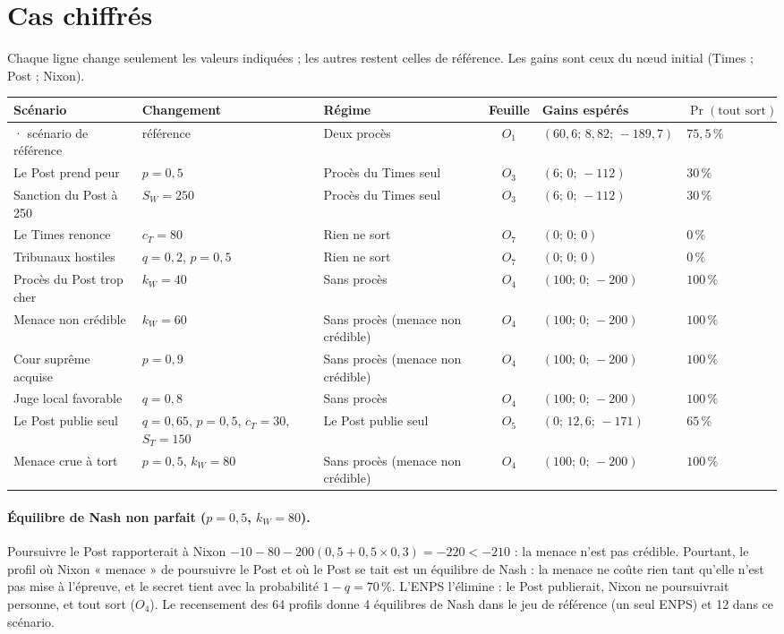 \documentclass[11pt,a4paper]{article}
\theoremstyle{definition}
\begin{document}
\section{Cas chiffrés}
Chaque ligne change seulement les valeurs indiquées ; les autres restent celles de référence. Les gains sont ceux du nœud initial (Times ; Post ; Nixon).
\begin{center}
\scriptsize
\begin{tabularx}{\textwidth}{@{}>{\raggedright\arraybackslash}p{3.1cm}>{\raggedright\arraybackslash}X>{\raggedright\arraybackslash}p{2.6cm}cll@{}}
\toprule
Scénario & Changement & Régime & Feuille & Gains espérés & $\Pr(\text{tout sort})$ \\
\midrule
1971 · scénario de référence & référence & Deux procès & $O_{1}$ & $(60,6;\,8,82;\,-189,7)$ & $75,5\,\%$ \\
Le Post prend peur & $p=0,5$ & Procès du Times seul & $O_{3}$ & $(6;\,0;\,-112)$ & $30\,\%$ \\
Sanction du Post à 250 & $S_W=250$ & Procès du Times seul & $O_{3}$ & $(6;\,0;\,-112)$ & $30\,\%$ \\
Le Times renonce & $c_T=80$ & Rien ne sort & $O_{7}$ & $(0;\,0;\,0)$ & $0\,\%$ \\
Tribunaux hostiles & $q=0,2$, $p=0,5$ & Rien ne sort & $O_{7}$ & $(0;\,0;\,0)$ & $0\,\%$ \\
Procès du Post trop cher & $k_W=40$ & Sans procès & $O_{4}$ & $(100;\,0;\,-200)$ & $100\,\%$ \\
Menace non crédible & $k_W=60$ & Sans procès (menace non crédible) & $O_{4}$ & $(100;\,0;\,-200)$ & $100\,\%$ \\
Cour suprême acquise & $p=0,9$ & Sans procès (menace non crédible) & $O_{4}$ & $(100;\,0;\,-200)$ & $100\,\%$ \\
Juge local favorable & $q=0,8$ & Sans procès & $O_{4}$ & $(100;\,0;\,-200)$ & $100\,\%$ \\
Le Post publie seul & $q=0,65$, $p=0,5$, $c_T=30$, $S_T=150$ & Le Post publie seul & $O_{5}$ & $(0;\,12,6;\,-171)$ & $65\,\%$ \\
Menace crue à tort & $p=0,5$, $k_W=80$ & Sans procès (menace non crédible) & $O_{4}$ & $(100;\,0;\,-200)$ & $100\,\%$ \\
\bottomrule
\end{tabularx}
\end{center}

\paragraph{Équilibre de Nash non parfait ($p=0,5$, $k_W=80$).} Poursuivre le Post rapporterait à Nixon $-10-80-200(0,5+0,5\times0,3)=-220<-210$ : la menace n'est pas crédible. Pourtant, le profil où Nixon « menace » de poursuivre le Post et où le Post se tait est un équilibre de Nash : la menace ne coûte rien tant qu'elle n'est pas mise à l'épreuve, et le secret tient avec la probabilité $1-q=70\,\%$. L'ENPS l'élimine : le Post publierait, Nixon ne poursuivrait personne, et tout sort ($O_4$). Le recensement des 64 profils donne 4 équilibres de Nash dans le jeu de référence (un seul ENPS) et 12 dans ce scénario.
\end{document}
